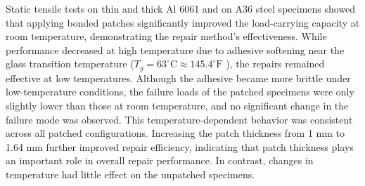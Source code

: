 \documentclass[journal,article,submit,pdftex,moreauthors]{Definitions/mdpi}
\begin{document}
Static tensile tests on thin and thick Al 6061 and on A36 steel specimens showed that applying bonded patches significantly improved the load-carrying capacity at room temperature, demonstrating the repair method's effectiveness. While performance decreased at high temperature due to adhesive softening near the glass transition temperature ($T_g = 63^\circ\mathrm{C} \approx 145.4^\circ\mathrm{F}$ \cite{delale2019}), the repairs remained effective at low temperatures. Although the adhesive became more brittle under low-temperature conditions, the failure loads of the patched specimens were only slightly lower than those at room temperature, and no significant change in the failure mode was observed. This temperature-dependent behavior was consistent across all patched configurations. Increasing the patch thickness from 1 mm to 1.64 mm further improved repair efficiency, indicating that patch thickness plays an important role in overall repair performance. In contrast, changes in temperature had little effect on the unpatched specimens.
\end{document}
